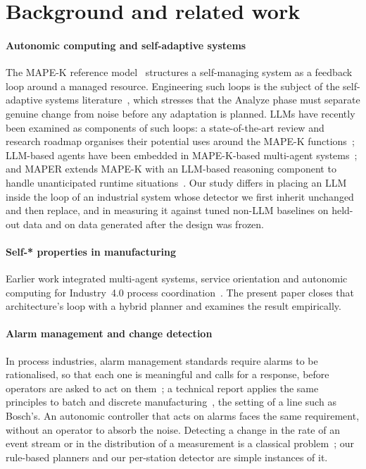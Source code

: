 \documentclass[preprint,11pt]{elsarticle}
\begin{document}
\section{Background and related work}
\label{sec:related}

\paragraph{Autonomic computing and self-adaptive systems}
The MAPE-K reference model~\cite{kephart2003vision} structures a self-managing system as a feedback loop around a managed resource. Engineering such loops is the subject of the self-adaptive systems literature~\cite{weyns2020introduction}, which stresses that the Analyze phase must separate genuine change from noise before any adaptation is planned. LLMs have recently been examined as components of such loops: a state-of-the-art review and research roadmap organises their potential uses around the MAPE-K functions~\cite{li2024genai,li2024exploring}; LLM-based agents have been embedded in MAPE-K-based multi-agent systems~\cite{nascimento2023selfadaptive}; and MAPER extends MAPE-K with an LLM-based reasoning component to handle unanticipated runtime situations~\cite{alves2026maper}. Our study differs in placing an LLM inside the loop of an industrial system whose detector we first inherit unchanged and then replace, and in measuring it against tuned non-LLM baselines on held-out data and on data generated after the design was frozen.

\paragraph{Self-* properties in manufacturing}
Earlier work integrated multi-agent systems, service orientation and autonomic computing for Industry~4.0 process coordination~\cite{sanchez2020selfstar,sanchez2020jii,sanchez2020survey}. The present paper closes that architecture's loop with a hybrid planner and examines the result empirically.

\paragraph{Alarm management and change detection}
In process industries, alarm management standards require alarms to be rationalised, so that each one is meaningful and calls for a response, before operators are asked to act on them~\cite{isa182}; a technical report applies the same principles to batch and discrete manufacturing~\cite{isatr1826}, the setting of a line such as Bosch's. An autonomic controller that acts on alarms faces the same requirement, without an operator to absorb the noise. Detecting a change in the rate of an event stream or in the distribution of a measurement is a classical problem~\cite{basseville1993detection}; our rule-based planners and our per-station detector are simple instances of it.
\end{document}
